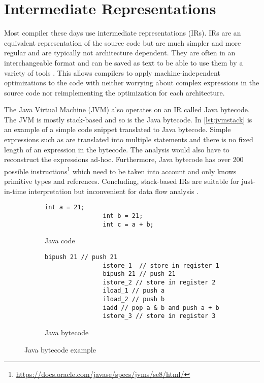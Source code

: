 \documentclass[../draft.tex]{subfiles}
\begin{document}
    \section{Intermediate Representations}\label{s:jimple}
    Most compiler these days use intermediate representations (IRs). IRs are an equivalent representation of the source code but are much simpler and more regular and are typically not architecture dependent. They are often in an interchangeable format and can be saved as text to be able to use them by a variety of tools \cite{Thain2019}.
    This allows compilers to apply machine-independent optimizations to the code with neither worrying about complex expressions in the source code nor reimplementing the optimization for each architecture. 

    The Java Virtual Machine (JVM) also operates on an IR called Java bytecode. The JVM is mostly stack-based and so is the Java bytecode. In \autoref{lst:jvmstack} is an example of a simple code snippet translated to Java bytecode. Simple expressions such as  are translated into multiple statements and there is no fixed length of an expression in the bytecode. The analysis would also have to reconstruct the expressions ad-hoc. Furthermore, Java bytecode has over 200 possible instructions\footnote{\url{https://docs.oracle.com/javase/specs/jvms/se8/html/}} which need to be taken into account and only knows primitive types and references. Concluding, stack-based IRs are suitable for just-in-time interpretation but inconvenient for data flow analysis \cite{Valleerai2004}.

    \begin{figure}[ht]
        \centering
        \begin{subfigure}[b]{0.45\textwidth}
            \centering
            \begin{lstlisting}[gobble=16]
                int a = 21;
                int b = 21;
                int c = a + b;
            \end{lstlisting}
            \caption{Java code}
            \label{lst:jvmstack_a}
        \end{subfigure}
        \hfill
        \begin{subfigure}[b]{0.45\textwidth}
            \centering
            \begin{lstlisting}[gobble=16]
                bipush 21 // push 21
                istore_1  // store in register 1    
                bipush 21 // push 21
                istore_2 // store in register 2
                iload_1 // push a
                iload_2 // push b
                iadd // pop a & b and push a + b
                istore_3 // store in register 3
            \end{lstlisting}
            \caption{Java bytecode}
            \label{lst:jvmstack_b}
        \end{subfigure}
        \caption{Java bytecode example}
        \label{lst:jvmstack}
    \end{figure}
\end{document}
